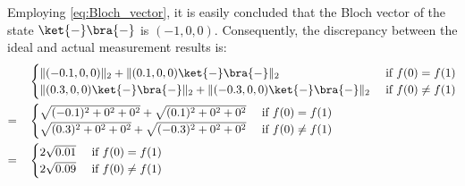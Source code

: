     Employing \autoref{eq:Bloch_vector}, it is easily concluded that the Bloch vector of the state $\ket{-} \bra{-}$ is $(-1,0,0)$. Consequently,  the discrepancy between the ideal and actual measurement results is:
    \begin{equation}
      \begin{split}
        & 
        \begin{cases}
          \lVert (-0.1,0,0) \rVert_{2} + \lVert (0.1,0,0) \ket{-} \bra{-}\rVert_{2} &\text{ if }   f(0)= f(1) \\
          \lVert(0.3,0,0)\ket{-} \bra{-}\rVert_{2} + \lVert (-0.3,0,0) \ket{-} \bra{-}\rVert_{2} &\text{ if }   f(0) \neq f(1)
        \end{cases} \\
        = \quad &
        \begin{cases}
          \sqrt{(-0.1)^{2} + 0^{2} + 0^{2}} + \sqrt{(0.1)^{2} + 0^{2} + 0^{2}} &\text{ if }   f(0)= f(1) \\
          \sqrt{(0.3)^{2} + 0^{2} + 0^{2}} + \sqrt{(-0.3)^{2} + 0^{2} + 0^{2}} &\text{ if }   f(0) \neq f(1)
        \end{cases} \\
        = \quad &
        \begin{cases}
          2 \sqrt{0.01} &\text{ if }   f(0)= f(1) \\
          2 \sqrt{0.09}  &\text{ if }   f(0) \neq f(1)
        \end{cases} \\
      \end{split}
  \end{equation}
  
